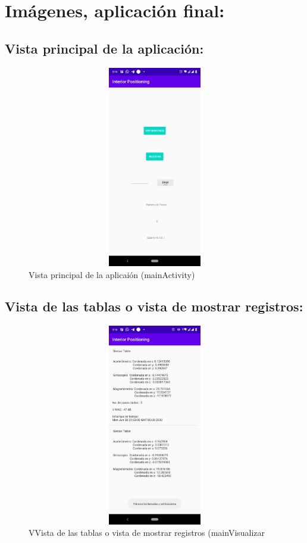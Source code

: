 \documentclass[conference,compsoc,onecolumn]{IEEEtran}
\begin{document}
\section{Imágenes, aplicación final:}

\subsection{Vista principal de la aplicación:}
\begin{figure}[H]
\centering
\includegraphics[keepaspectratio, width=400pt ,height=250pt]{Imagenes/imagen10.jpeg}
\caption{Vista principal de la aplicaión (mainActivity)}
\end{figure}
\enskip
\subsection{Vista de las tablas o vista de mostrar registros:}
\begin{figure}[H]
\centering
\includegraphics[keepaspectratio, width=400pt ,height=250pt]{Imagenes/imagen11.jpeg}
\caption{VVista de las tablas o vista de mostrar registros (mainVisualizar}
\end{figure}
\enskip
\end{document}
